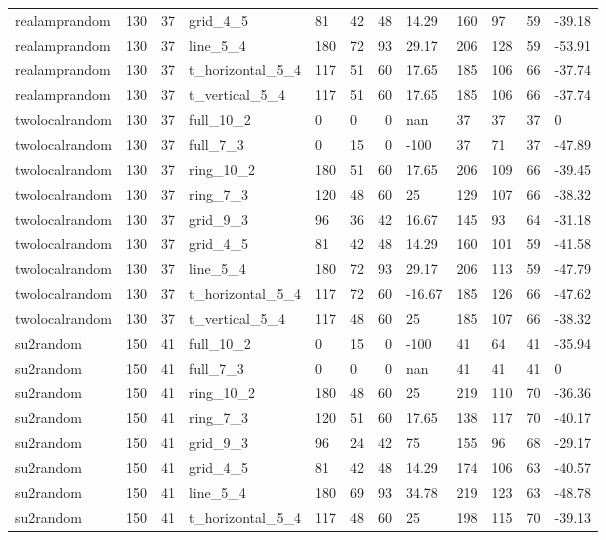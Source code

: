 \begin{longtable}{lrrlllrlllrl}
realamprandom & 130 & 37 & grid\_4\_5 & 81 & 42 & 48 & 14.29 & 160 & 97 & 59 & -39.18 \\
realamprandom & 130 & 37 & line\_5\_4 & 180 & 72 & 93 & 29.17 & 206 & 128 & 59 & -53.91 \\
realamprandom & 130 & 37 & t\_horizontal\_5\_4 & 117 & 51 & 60 & 17.65 & 185 & 106 & 66 & -37.74 \\
realamprandom & 130 & 37 & t\_vertical\_5\_4 & 117 & 51 & 60 & 17.65 & 185 & 106 & 66 & -37.74 \\
twolocalrandom & 130 & 37 & full\_10\_2 & 0 & 0 & 0 & nan & 37 & 37 & 37 & 0 \\
twolocalrandom & 130 & 37 & full\_7\_3 & 0 & 15 & 0 & -100 & 37 & 71 & 37 & -47.89 \\
twolocalrandom & 130 & 37 & ring\_10\_2 & 180 & 51 & 60 & 17.65 & 206 & 109 & 66 & -39.45 \\
twolocalrandom & 130 & 37 & ring\_7\_3 & 120 & 48 & 60 & 25 & 129 & 107 & 66 & -38.32 \\
twolocalrandom & 130 & 37 & grid\_9\_3 & 96 & 36 & 42 & 16.67 & 145 & 93 & 64 & -31.18 \\
twolocalrandom & 130 & 37 & grid\_4\_5 & 81 & 42 & 48 & 14.29 & 160 & 101 & 59 & -41.58 \\
twolocalrandom & 130 & 37 & line\_5\_4 & 180 & 72 & 93 & 29.17 & 206 & 113 & 59 & -47.79 \\
twolocalrandom & 130 & 37 & t\_horizontal\_5\_4 & 117 & 72 & 60 & -16.67 & 185 & 126 & 66 & -47.62 \\
twolocalrandom & 130 & 37 & t\_vertical\_5\_4 & 117 & 48 & 60 & 25 & 185 & 107 & 66 & -38.32 \\
su2random & 150 & 41 & full\_10\_2 & 0 & 15 & 0 & -100 & 41 & 64 & 41 & -35.94 \\
su2random & 150 & 41 & full\_7\_3 & 0 & 0 & 0 & nan & 41 & 41 & 41 & 0 \\
su2random & 150 & 41 & ring\_10\_2 & 180 & 48 & 60 & 25 & 219 & 110 & 70 & -36.36 \\
su2random & 150 & 41 & ring\_7\_3 & 120 & 51 & 60 & 17.65 & 138 & 117 & 70 & -40.17 \\
su2random & 150 & 41 & grid\_9\_3 & 96 & 24 & 42 & 75 & 155 & 96 & 68 & -29.17 \\
su2random & 150 & 41 & grid\_4\_5 & 81 & 42 & 48 & 14.29 & 174 & 106 & 63 & -40.57 \\
su2random & 150 & 41 & line\_5\_4 & 180 & 69 & 93 & 34.78 & 219 & 123 & 63 & -48.78 \\
su2random & 150 & 41 & t\_horizontal\_5\_4 & 117 & 48 & 60 & 25 & 198 & 115 & 70 & -39.13 \\

\end{longtable}
